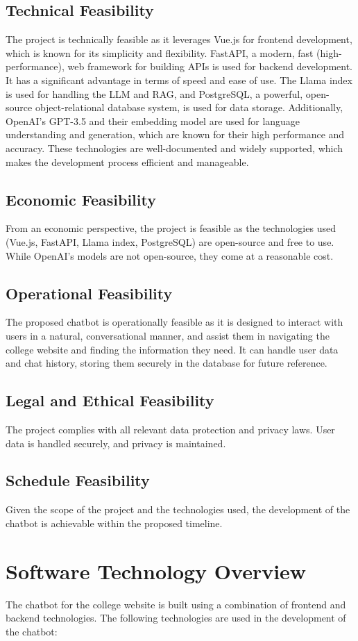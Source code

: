 \subsection{Technical Feasibility}
The project is technically feasible as it leverages Vue.js for frontend development, which is known for its simplicity and flexibility. FastAPI, a modern, fast (high-performance), web framework for building APIs is used for backend development. It has a significant advantage in terms of speed and ease of use. The Llama index is used for handling the LLM and RAG, and PostgreSQL, a powerful, open-source object-relational database system, is used for data storage. Additionally, OpenAI's GPT-3.5 and their embedding model are used for language understanding and generation, which are known for their high performance and accuracy. These technologies are well-documented and widely supported, which makes the development process efficient and manageable.
\subsection{Economic Feasibility}
From an economic perspective, the project is feasible as the technologies used (Vue.js, FastAPI, Llama index, PostgreSQL) are open-source and free to use. While OpenAI's models are not open-source, they come at a reasonable cost.
\subsection{Operational Feasibility}
The proposed chatbot is operationally feasible as it is designed to interact with users in a natural, conversational manner, and assist them in navigating the college website and finding the information they need. It can handle user data and chat history, storing them securely in the database for future reference.
\subsection{Legal and Ethical Feasibility}
The project complies with all relevant data protection and privacy laws. User data is handled securely, and privacy is maintained.
\subsection{Schedule Feasibility}
Given the scope of the project and the technologies used, the development of the chatbot is achievable within the proposed timeline.
\section{Software Technology Overview}
The chatbot for the college website is built using a combination of frontend and backend technologies. The following technologies are used in the development of the chatbot:

